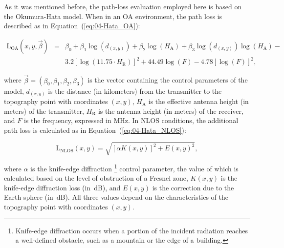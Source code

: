 As it was mentioned before, the path-loss evaluation employed here
is based on the Okumura-Hata model. When in an OA environment, the
path loss is described as in Equation~(\ref{eq:04-Hata_OA}):

\begin{eqnarray}
\mathrm{L}{}_{\mathrm{OA}}(x,y,\vec{\beta}) & = & \beta_{0}+\beta_{1}\log(d_{(x,y)})+\beta_{2}\log(H_{\mathrm{A}})+\beta_{3}\log(d_{(x,y)})\log(H_{\mathrm{A}})-\nonumber \\
 &  & 3.2\left[\log(11.75\cdot H_{\mathrm{R}})\right]^{2}+44.49\log(F)-4.78\left[\log(F)\right]^{2},\label{eq:04-Hata_OA}
\end{eqnarray}


\noindent {}

\noindent where $\vec{\beta}=(\beta_{0},\beta_{1},\beta_{2},\beta_{3})$
is the vector containing the control parameters of the model, $d_{(x,y)}$
is the distance (in kilometers) from the transmitter to the topography
point with coordinates $(x,y)$, $H_{\mathrm{A}}$ is the effective
antenna height (in meters) of the transmitter, $H_{\mathrm{R}}$ is
the antenna height (in meters) of the receiver, and $F$ is the frequency,
expressed in MHz. In NLOS conditions, the additional path loss is
calculated as in Equation~(\ref{eq:04-Hata_NLOS}):

\begin{equation}
\mathrm{L}{}_{\mathrm{NLOS}}(x,y)=\sqrt{\left[\alpha K(x,y)\right]^{2}+E(x,y)^{2}},\label{eq:04-Hata_NLOS}
\end{equation}


\noindent {}

\noindent where $\alpha$ is the knife-edge diffraction%
\footnote{\noindent Knife-edge diffraction occurs when a portion of the incident
radiation reaches a well-defined obstacle, such as a mountain or the
edge of a building.%
} control parameter, the value of which is calculated based on the
level of obstruction of a Fresnel zone, $K(x,y)$ is the knife-edge
diffraction loss (in~dB), and $E(x,y)$ is the correction due to
the Earth sphere (in~dB). All three values depend on the characteristics
of the topography point with coordinates $(x,y)$.

